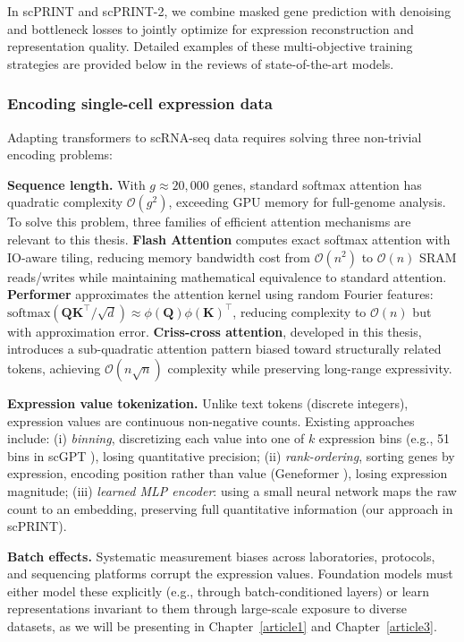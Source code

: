 In scPRINT and scPRINT-2, we combine masked gene prediction with denoising and bottleneck losses to jointly optimize for
expression reconstruction and representation quality. Detailed examples of these multi-objective
training strategies are provided below in the reviews of state-of-the-art models.

\subsubsection{Encoding single-cell expression data}
Adapting transformers to \gls{scRNA-seq} data requires solving three non-trivial encoding
problems:

\textbf{Sequence length.} With \(g \approx 20{,}000\) genes, standard softmax attention has
quadratic complexity \(\mathcal{O}(g^2)\), exceeding GPU memory for full-genome analysis. To solve this problem, 
three families of efficient attention mechanisms are relevant to this thesis. \textbf{Flash
Attention} \cite{daoFlashAttention2FasterAttention2023} computes exact softmax attention with
IO-aware tiling, reducing memory bandwidth cost from \(\mathcal{O}(n^2)\) to
\(\mathcal{O}(n)\) SRAM reads/writes while maintaining mathematical equivalence to standard
attention. \textbf{Performer} \cite{choromanskiRethinkingAttentionPerformers2022} approximates
the attention kernel using random Fourier features:
\(\text{softmax}(\mathbf{Q}\mathbf{K}^\top/\sqrt{d}) \approx \phi(\mathbf{Q})\phi(\mathbf{K})^\top\),
reducing complexity to \(\mathcal{O}(n)\) but with approximation error.
\textbf{Criss-cross attention}, developed in this thesis, introduces a sub-quadratic
attention pattern biased toward structurally related tokens, achieving \(\mathcal{O}(n \sqrt{n})\)
complexity while preserving long-range expressivity.

\textbf{Expression value tokenization.} Unlike text tokens (discrete integers), expression values
are continuous non-negative counts. Existing approaches include: (i) \emph{binning}, discretizing
each value into one of \(k\) expression bins (e.g., 51 bins in scGPT \cite{cuiScGPTBuildingFoundation2024}),
losing quantitative precision; (ii) \emph{rank-ordering}, sorting genes by expression, encoding
position rather than value (Geneformer \cite{theodorisTransferLearningEnables2023}), losing
expression magnitude; (iii) \emph{learned \gls{MLP} encoder}: using a small neural network maps the
raw count to an embedding, preserving full quantitative information (our approach in scPRINT).

\textbf{Batch effects.} Systematic measurement biases across laboratories, protocols, and
sequencing platforms corrupt the expression values. Foundation models must either model these
explicitly (e.g., through batch-conditioned layers) or learn representations invariant to them
through large-scale exposure to diverse datasets, as we will be presenting in Chapter~\ref{article1} and Chapter~\ref{article3}.

